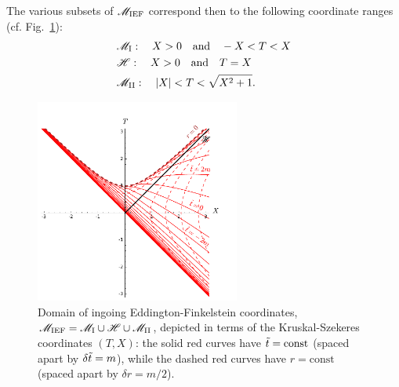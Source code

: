    \iff
\ee
The various subsets of $\mathscr{M}_{\rm IEF}$ correspond then to the following
coordinate ranges (cf. Fig.~\ref{f:sch:IEF_KS}):
\begin{subequations}
\begin{align}
 & \mathscr{M}_{\rm I}: \quad X > 0 \quad\mbox{and}\quad -X < T < X \\
 & \mathscr{H}: \quad X > 0 \quad\mbox{and}\quad  T = X \\
 & \mathscr{M}_{\rm II}: \quad |X| < T < \sqrt{X^2+1} .
\end{align}
\end{subequations}

\begin{figure}
\centerline{\includegraphics[width=0.6\textwidth]{sch_IEF_KS.pdf}}
\caption[]{\label{f:sch:IEF_KS} \footnotesize
Domain of ingoing Eddington-Finkelstein coordinates, $\mathscr{M}_{\rm IEF} = \mathscr{M}_{\rm I}\cup \mathscr{H}\cup \mathscr{M}_{\rm II}$, depicted in terms of the Kruskal-Szekeres coordinates $(T,X)$: the solid red
curves have ${\tilde t}=\mathrm{const}$ (spaced apart by $\delta{\tilde t} = m$), while the
dashed red curves have $r=\mathrm{const}$ (spaced apart by $\delta r = m/2$).}
\end{figure}


